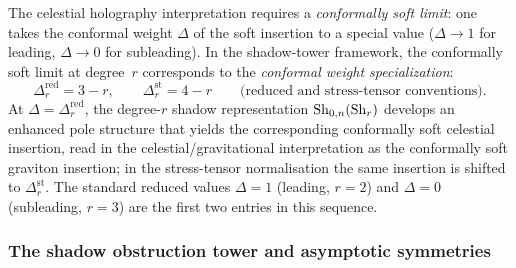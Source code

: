 \begin{remark}
The celestial holography interpretation requires a
\emph{conformally soft limit}: one takes the conformal weight
$\Delta$ of the soft insertion to a special value
($\Delta \to 1$ for leading, $\Delta \to 0$ for subleading).
In the shadow-tower framework, the conformally soft limit at
degree~$r$ corresponds to the \emph{conformal weight
specialization}:
\[
\Delta_r^{\mathrm{red}} = 3 - r,
\qquad
\Delta_r^{\mathrm{st}} = 4 - r
\qquad
\text{(reduced and stress-tensor conventions)}.
\]
At $\Delta = \Delta_r^{\mathrm{red}}$, the degree-$r$ shadow representation
$\operatorname{Sh}_{0,n}(\operatorname{Sh}_r)$ develops an enhanced pole structure that
yields the corresponding conformally soft celestial insertion, read
in the celestial/gravitational interpretation as the conformally soft
graviton insertion; in the stress-tensor normalisation the same
insertion is shifted to $\Delta_r^{\mathrm{st}}$. The standard reduced
values
$\Delta = 1$ (leading, $r=2$) and $\Delta = 0$ (subleading,
$r=3$) are the first two entries in this sequence.
\end{remark}

\subsubsection{The shadow obstruction tower and asymptotic symmetries}

